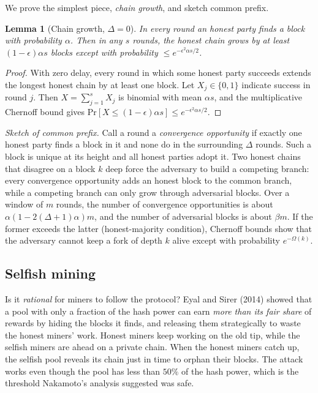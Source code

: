 \documentclass[11pt,a4paper]{article}
\newenvironment{plainenglish}{\par\smallskip}{\par\smallskip}
\newenvironment{formal}{\par\smallskip}{\par\smallskip}
\theoremstyle{definition}
\theoremstyle{plain}
\newtheorem{lemma}[definition]{Lemma}
\theoremstyle{remark}
\renewcommand{\Pr}{\mathrm{Pr}}
\begin{document}
\begin{formal}
We prove the simplest piece, \emph{chain growth}, and sketch common prefix.
\begin{lemma}[Chain growth, $\Delta=0$]
In every round an honest party finds a block with probability $\alpha$. Then in any $s$ rounds, the honest chain grows by at least $(1-\epsilon)\alpha s$ blocks except with probability $\le e^{-\epsilon^2\alpha s/2}$.
\end{lemma}
\begin{proof}
With zero delay, every round in which some honest party succeeds extends the longest honest chain by at least one block. Let $X_j\in\{0,1\}$ indicate success in round $j$. Then $X=\sum_{j=1}^sX_j$ is binomial with mean $\alpha s$,
and the multiplicative Chernoff bound gives $\Pr[X\le(1-\epsilon)\alpha s]\le e^{-\epsilon^2\alpha s/2}$.
\end{proof}

\emph{Sketch of common prefix.} Call a round a \emph{convergence opportunity} if exactly one honest party finds a block in it and none do in the surrounding $\Delta$ rounds. Such a block is unique at its height and all honest parties adopt it. Two honest chains that disagree
on a block $k$ deep force the adversary to build a competing branch: every convergence opportunity adds an honest block to the common branch, while a competing branch can only grow through adversarial blocks. Over a window of $m$ rounds, the number of convergence opportunities is about $\alpha(1-2(\Delta+1)\alpha)m$,
and the number of adversarial blocks is about $\beta m$. If the former exceeds the latter (honest-majority condition), Chernoff bounds show that the adversary cannot keep a fork of depth $k$ alive except with probability $e^{-\Omega(k)}$.
\end{formal}

\subsection{Selfish mining}

\begin{plainenglish}
Is it \emph{rational} for miners to follow the protocol? Eyal and Sirer (2014) showed that a pool with only a fraction of the hash power can earn \emph{more than its fair share} of rewards by hiding the blocks it finds, and releasing them
strategically to waste the honest miners' work. Honest miners keep working on the old tip, while the selfish miners are ahead on a private chain. When the honest miners catch up, the selfish pool reveals its chain just in time to orphan their blocks.
The attack works even though the pool has less than $50\%$ of the hash power, which is the threshold Nakamoto's analysis suggested was safe.
\end{plainenglish}
\end{document}
